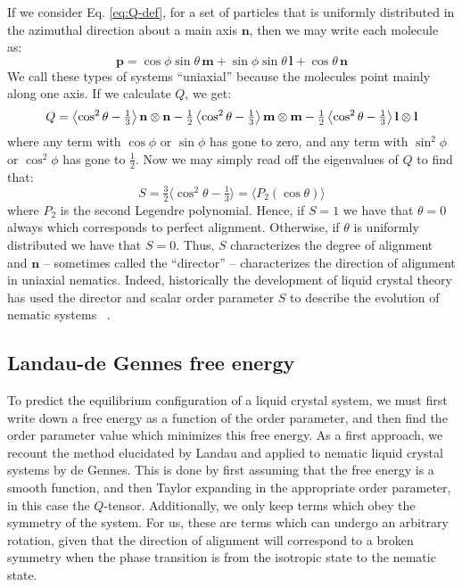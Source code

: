 \documentclass[reqno]{article}
\begin{document}
  If we consider Eq. \eqref{eq:Q-def}, for a set of particles that is uniformly
  distributed in the azimuthal direction about a main axis $\mathbf{n}$, then we may
  write each molecule as:
  \begin{equation}
    \mathbf{p}
    =
    \cos\phi \sin\theta \, \mathbf{m}
    + \sin\phi \sin\theta \, \mathbf{l}
    + \cos\theta \, \mathbf{n}
  \end{equation}
  We call these types of systems ``uniaxial'' because the molecules point mainly
  along one axis.
  If we calculate $Q$, we get:
  \begin{equation} \label{eq:uniaxial-Q-decomposition}
      Q
      = 
      \left< \cos^2 \theta - \tfrac13 \right> \mathbf{n} \otimes \mathbf{n}
      - \tfrac12 \left< \cos^2\theta - \tfrac13 \right> \mathbf{m} \otimes \mathbf{m}
      - \tfrac12 \left< \cos^2\theta - \tfrac13 \right> \mathbf{l} \otimes \mathbf{l}\\
  \end{equation}
  where any term with $\cos\phi$ or $\sin\phi$ has gone to zero, and any term
  with $\sin^2\phi$ or $\cos^2\phi$ has gone to $\tfrac12$.
  Now we may simply read off the eigenvalues of $Q$ to find that:
  \begin{equation}
    S
    = \tfrac32 \langle \cos^2 \theta - \tfrac13 \rangle
    = \langle P_2(\cos\theta) \rangle
  \end{equation}
  where $P_2$ is the second Legendre polynomial.
  Hence, if $S = 1$ we have that $\theta = 0$ always which corresponds to
  perfect alignment.
  Otherwise, if $\theta$ is uniformly distributed we have that $S = 0$.
  Thus, $S$ characterizes the degree of alignment and $\mathbf{n}$ -- sometimes called
  the ``director'' -- characterizes the direction of alignment in uniaxial
  nematics.
  Indeed, historically the development of liquid crystal theory has used the
  director and scalar order parameter $S$ to describe the evolution of nematic
  systems ~\cite{ericksen_hydrostatic_1962, ericksen_liquid_1991}.
  
  \subsection{Landau-de Gennes free energy}
  To predict the equilibrium configuration of a liquid crystal system, we must
  first write down a free energy as a function of the order parameter, and then
  find the order parameter value which minimizes this free energy.
  As a first approach, we recount the method elucidated by Landau and applied to
  nematic liquid crystal systems by de Gennes.
  This is done by first assuming that the free energy is a smooth function, and
  then Taylor expanding in the appropriate order parameter, in this case the
  $Q$-tensor.
  Additionally, we only keep terms which obey the symmetry of the system.
  For us, these are terms which can undergo an arbitrary rotation, given that
  the direction of alignment will correspond to a broken symmetry when the phase
  transition is from the isotropic state to the nematic state.
\end{document}
